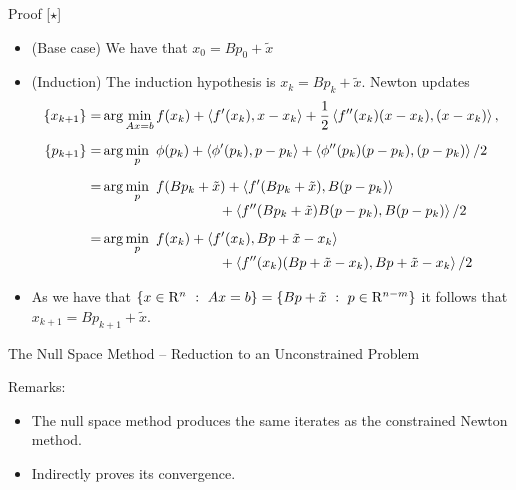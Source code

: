 \documentclass[9pt]{beamer}
\begin{document}
\begin{frame}{Proof [$\star$]}

  \begin{itemize}
  \item (Base case) We have that $x_0 = B p_0 + \tilde x$
  \item<2-> (Induction) The induction hypothesis is $x_k=B p_k+\tilde x$. Newton updates 
    \begin{align*}
      \{x_{k+1}\} = & \arg\min_{Ax=b} f(x_k)+ \left<f'(x_k), x-x_k\right> + \frac 12 \left<f''(x_k)(x-x_k), (x-x_k)\right>,\\[0.5em]
      \{p_{k+1}\} = & \arg\min_{p} ~ \phi(p_k)+ \left<\phi'(p_k), p-p_k\right> + \left<\phi''(p_k)(p-p_k), (p-p_k)\right>/2 \\[0.5em]
                 =   & \arg\min_{p} ~ f(Bp_k+\tilde x)+ \left<f'(Bp_k+\tilde x), B(p-p_k)\right>\\[-0.35em]
                    &\hspace{8.4em} + \left<f''(Bp_k+\tilde x)B (p-p_k), B (p-p_k)\right>/2 \\[0.5em]
      = & \arg\min_{p} ~ f(x_k)+ \left<f'(x_k), Bp+\tilde x-x_k\right> \\[-0.35em]
                    & \hspace{8.4em} + \left<f''(x_k)(Bp+\tilde x-x_k), Bp+\tilde x-x_k\right>/2 
    \end{align*}
  \item<3-> As we have that $\left\{ x\in\mathrm{R}^n\ : \ Ax=b \right\} = \left\{ Bp +\tilde x\ : \ p\in \mathrm{R}^{n-m} \right\}$ it follows that $x_{k+1} = Bp_{k+1}+\tilde x$.
  \end{itemize}
  
  
    

\end{frame}

\begin{frame}{The Null Space Method -- Reduction to an Unconstrained Problem}

  Remarks:
  \begin{itemize}
  \item The null space method produces the same iterates as the constrained Newton method.
  \item Indirectly proves its convergence.
  \end{itemize}
  
\end{frame}
\end{document}
